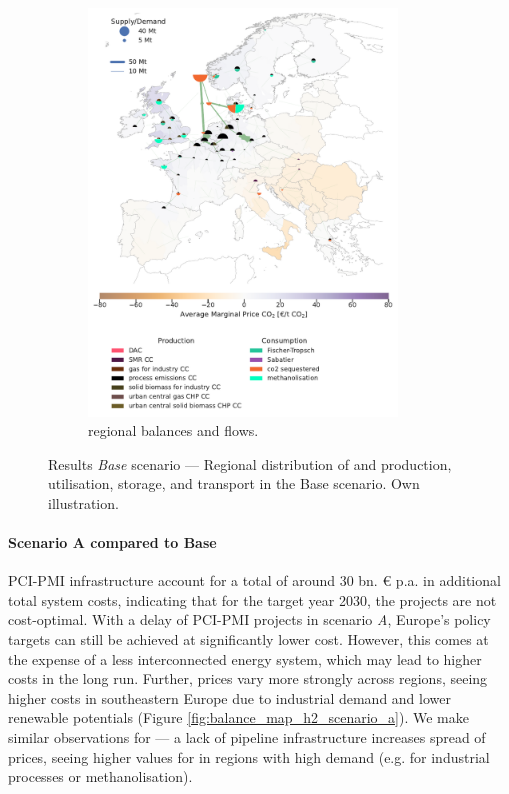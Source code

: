 \documentclass[preprint,12pt]{elsarticle}
\begin{document}
\begin{figure}[htbp]
\begin{subfigure}[t]{0.47\textwidth}
      \includegraphics[width=0.9\textwidth]{balance_map_co2_base} %
      \caption{ regional balances and flows.}
      \label{fig:balance_map_co2_base}
  \end{subfigure}
  \caption{Results \textit{Base} scenario --- Regional distribution of  and  production, utilisation, storage, and transport in the Base scenario. Own illustration.}
  \label{fig:balance_maps_base}
\end{figure}

\paragraph{Scenario A compared to Base} PCI-PMI infrastructure account for a total of around 30 bn. \euro{} p.a. in additional total system costs, indicating that for the target year 2030, the projects are not cost-optimal. With a delay of PCI-PMI projects in scenario \textit{A}, Europe's policy targets can still be achieved at significantly lower cost. However, this comes at the expense of a less interconnected energy system, which may lead to higher costs in the long run. Further,  prices vary more strongly across regions, seeing higher costs in southeastern Europe due to industrial demand and lower renewable potentials (Figure \ref{fig:balance_map_h2_scenario_a}). We make similar observations for  --- a lack of pipeline infrastructure increases spread of  prices, seeing higher values for  in regions with high demand (e.g. for industrial processes or methanolisation). 
\end{document}
